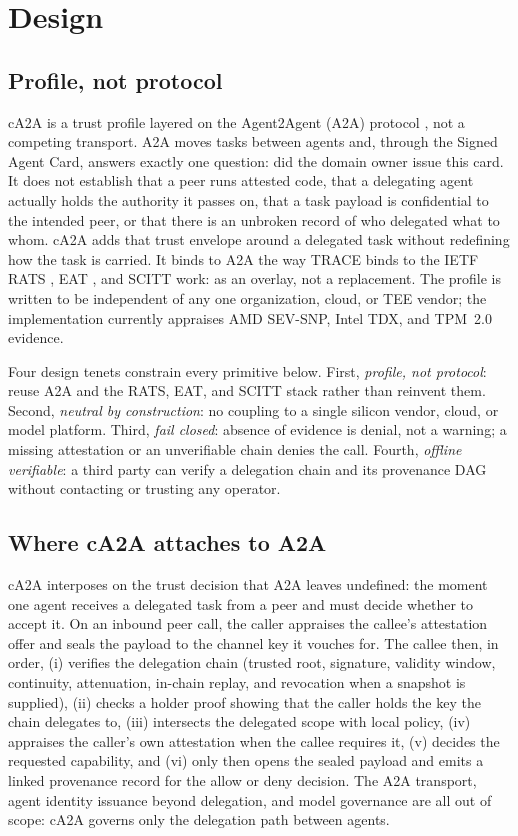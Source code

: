 \section{Design}\label{sec:design}

\subsection{Profile, not protocol}

cA2A is a trust profile layered on the Agent2Agent (A2A) protocol \citep{a2a2026}, not a
competing transport. A2A moves tasks between agents and, through the Signed Agent Card,
answers exactly one question: did the domain owner issue this card. It does not establish
that a peer runs attested code, that a delegating agent actually holds the authority it
passes on, that a task payload is confidential to the intended peer, or that there is an
unbroken record of who delegated what to whom. cA2A adds that trust envelope around a
delegated task without redefining how the task is carried. It binds to A2A the way TRACE
\citep{trace2025} binds to the IETF RATS \citep{rats2021}, EAT \citep{eat2023}, and SCITT
\citep{scitt2024} work: as an overlay, not a replacement. The profile is written to be
independent of any one organization, cloud, or TEE vendor; the implementation currently
appraises AMD SEV-SNP, Intel TDX, and TPM~2.0 evidence.

Four design tenets constrain every primitive below. First, \emph{profile, not protocol}:
reuse A2A and the RATS, EAT, and SCITT stack rather than reinvent them. Second, \emph{neutral by
construction}: no coupling to a single silicon vendor, cloud, or model platform. Third,
\emph{fail closed}: absence of evidence is denial, not a warning; a missing attestation or an
unverifiable chain denies the call. Fourth, \emph{offline verifiable}: a third party can
verify a delegation chain and its provenance DAG without contacting or trusting any operator.

\subsection{Where cA2A attaches to A2A}

cA2A interposes on the trust decision that A2A leaves undefined: the moment one agent
receives a delegated task from a peer and must decide whether to accept it. On an inbound
peer call, the caller appraises the callee's attestation offer and seals the payload to the
channel key it vouches for. The callee then, in order, (i) verifies the delegation chain
(trusted root, signature, validity window, continuity, attenuation, in-chain replay, and
revocation when a snapshot is supplied), (ii) checks a holder proof showing that the caller
holds the key the chain delegates to, (iii) intersects the delegated scope with local policy,
(iv) appraises the caller's own attestation when the callee requires it, (v) decides the
requested capability, and (vi) only then opens the sealed payload and emits a linked
provenance record for the allow or deny decision. The A2A transport, agent identity issuance beyond delegation, and model governance
are all out of scope: cA2A governs only the delegation path between agents.

